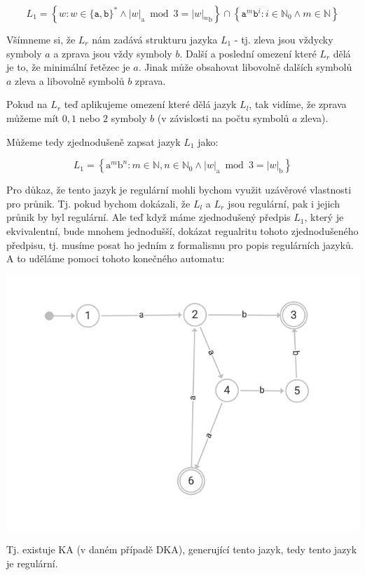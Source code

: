 \documentclass[10pt]{article}
\begin{document}
\begin{description}
$$L_1=\left\{w: w \in\{\mathtt{a}, \mathtt{b}\}^{*} \wedge|w|_{\mathrm{a}} \bmod 3=|w|_{\mathrm{^{m}\mathrm{b}}}\right\} \cap \left\{\mathtt{a}^{m} \mathtt{b}^{i}: i \in \mathbb{N}_{0} \land m \in \mathbb{N}\right\}$$

Všímneme si, že $L_r$ nám zadává strukturu jazyka $L_1$ - tj. zleva jsou vždycky symboly $a$ a zprava jsou vždy symboly $b$. Další a poslední omezení které $L_r$ dělá je to, že minimální řetězec je $a$. Jinak může obsahovat libovolně dalších symbolů $a$ zleva a libovolně symbolů $b$ zprava.

Pokud na $L_r$ teď aplikujeme omezení které dělá jazyk $L_l$, tak vidíme, že zprava můžeme mít $0, 1 \text{ nebo } 2$ symboly $b$ (v závislosti na počtu symbolů $a$ zleva).

Můžeme tedy zjednodušeně zapsat jazyk $L_1$ jako:

$$L_1 = \left\{
\mathrm{a}^{m}\mathrm{b}^{n}:m\in\mathbb{N}, n\in\mathbb{N}_{0} \land |w|_{\mathrm{a}} \bmod 3=|w|_{\mathrm{b}}
\right\}$$


Pro důkaz, že tento jazyk je regulární mohli bychom využit uzávěrové vlastnosti pro průnik. Tj. pokud bychom dokázali, že $L_l$ a $L_r$ jsou regulární, pak i jejich průnik by byl regulární. Ale teď když máme zjednodušený předpis $L_1$, který je ekvivalentní, bude mnohem jednodušší, dokázat regualritu tohoto zjednodušeného předpisu, tj. musíme posat ho jedním z formalismu pro popis regulárních jazyků. A to uděláme pomoci tohoto konečného automatu:

\includegraphics[width=\textwidth]{automat.png}

Tj. existuje KA (v daném případě DKA), generující tento jazyk, tedy tento jazyk je regulární. 


\end{description}
\end{document}
